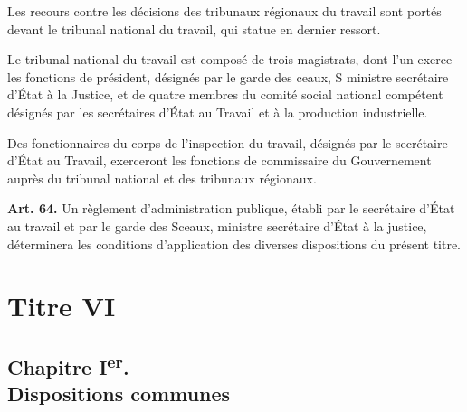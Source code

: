 \documentclass[french,twoside]{book} %
\newcommand{\labelchar}[1]{\textbf{\color{rubric} #1}}
\begin{document}
\noindent Les recours contre les décisions des tribunaux régionaux du travail sont portés devant le tribunal national du travail, qui statue en dernier ressort.\par
Le tribunal national du travail est composé de trois magistrats, dont l’un exerce les fonctions de président, désignés par le garde des ceaux, S ministre secrétaire d’État à la Justice, et de quatre membres du comité social national compétent désignés par les secrétaires d’État au Travail et à la production industrielle.\par
Des fonctionnaires du corps de l’inspection du travail, désignés par le secrétaire d’État au Travail, exerceront les fonctions de commissaire du Gouvernement auprès du tribunal national et des tribunaux régionaux.\par
\bigbreak
\noindent \labelchar{Art. 64.} Un règlement d’administration publique, établi par le secrétaire d’État au travail et par le garde des Sceaux, ministre secrétaire d’État à la justice, déterminera les conditions d’application des diverses dispositions du présent titre.

\section[{Titre VI}]{Titre VI}
\renewcommand{\leftmark}{Titre VI}


\subsection[{Chapitre Ier. Dispositions communes}]{Chapitre I\textsuperscript{er}. \\
Dispositions communes}
\end{document}
